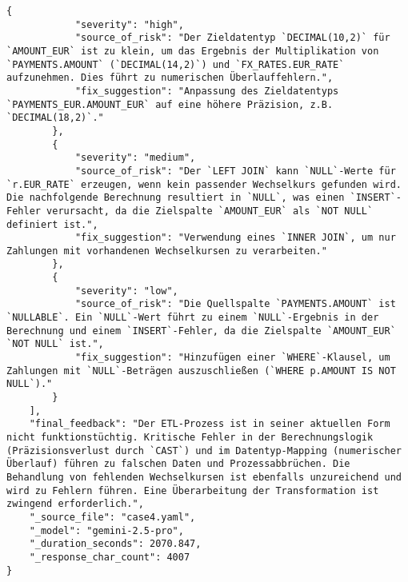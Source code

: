 \begin{lstlisting}[caption={Ausgabe: GEMINI 2.5 Pro Anwendungsfall 4 Konsistenzdurchlauf},label={gemini_case4_prompt2}]
        {
            "severity": "high",
            "source_of_risk": "Der Zieldatentyp `DECIMAL(10,2)` für `AMOUNT_EUR` ist zu klein, um das Ergebnis der Multiplikation von `PAYMENTS.AMOUNT` (`DECIMAL(14,2)`) und `FX_RATES.EUR_RATE` aufzunehmen. Dies führt zu numerischen Überlauffehlern.",
            "fix_suggestion": "Anpassung des Zieldatentyps `PAYMENTS_EUR.AMOUNT_EUR` auf eine höhere Präzision, z.B. `DECIMAL(18,2)`."
        },
        {
            "severity": "medium",
            "source_of_risk": "Der `LEFT JOIN` kann `NULL`-Werte für `r.EUR_RATE` erzeugen, wenn kein passender Wechselkurs gefunden wird. Die nachfolgende Berechnung resultiert in `NULL`, was einen `INSERT`-Fehler verursacht, da die Zielspalte `AMOUNT_EUR` als `NOT NULL` definiert ist.",
            "fix_suggestion": "Verwendung eines `INNER JOIN`, um nur Zahlungen mit vorhandenen Wechselkursen zu verarbeiten."
        },
        {
            "severity": "low",
            "source_of_risk": "Die Quellspalte `PAYMENTS.AMOUNT` ist `NULLABLE`. Ein `NULL`-Wert führt zu einem `NULL`-Ergebnis in der Berechnung und einem `INSERT`-Fehler, da die Zielspalte `AMOUNT_EUR` `NOT NULL` ist.",
            "fix_suggestion": "Hinzufügen einer `WHERE`-Klausel, um Zahlungen mit `NULL`-Beträgen auszuschließen (`WHERE p.AMOUNT IS NOT NULL`)."
        }
    ],
    "final_feedback": "Der ETL-Prozess ist in seiner aktuellen Form nicht funktionstüchtig. Kritische Fehler in der Berechnungslogik (Präzisionsverlust durch `CAST`) und im Datentyp-Mapping (numerischer Überlauf) führen zu falschen Daten und Prozessabbrüchen. Die Behandlung von fehlenden Wechselkursen ist ebenfalls unzureichend und wird zu Fehlern führen. Eine Überarbeitung der Transformation ist zwingend erforderlich.",
    "_source_file": "case4.yaml",
    "_model": "gemini-2.5-pro",
    "_duration_seconds": 2070.847,
    "_response_char_count": 4007
}
\end{lstlisting}

